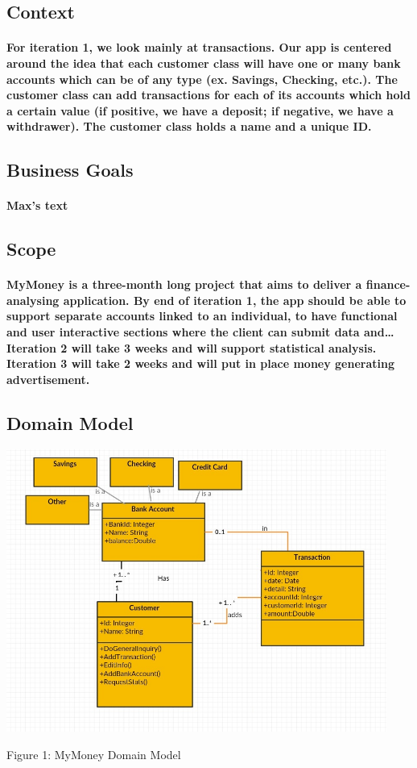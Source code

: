 \documentclass{article}
\begin{document}
\subsection{Context}
\paragraph{\indent For iteration 1, we look mainly at transactions. Our app is centered around the idea that each customer class will have one or many bank accounts which can be of any type (ex. Savings, Checking, etc.). The customer class can add transactions for each of its accounts which hold a certain value (if positive, we have a deposit; if negative, we have a withdrawer). The customer class holds a name and a unique ID.}

\subsection{Business Goals}
\paragraph{\indent Max's text}

\subsection{Scope}
\paragraph{\indent MyMoney is a three-month long project that aims to deliver a finance-analysing application.  By end of iteration 1, the app should be able to support separate accounts linked to an individual, to have functional and user interactive sections where the client can submit data and… Iteration 2 will take 3 weeks and will support statistical analysis. Iteration 3 will take 2 weeks and will put in place money generating advertisement. }

\subsection{Domain Model}


\includegraphics[width=12.5cm]{dm.jpg}
\caption{Figure 1: MyMoney Domain Model}
\end{document}
